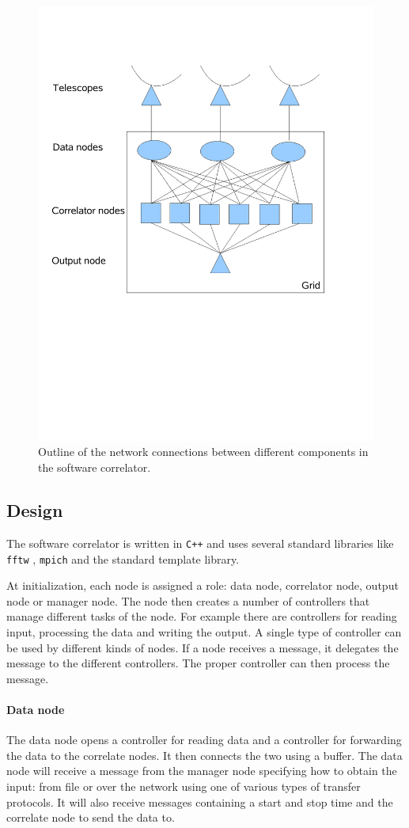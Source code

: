 \documentclass[12pt]{article}
\begin{document}
\begin{figure}
  \centering
  \includegraphics[width=.45\textwidth]
    {img/NetworkConnections}
    \caption{Outline of the network connections between different
      components in the software correlator.}
  \label{fig:netw_corr}
\end{figure}


\subsection{Design}
The software correlator is written in \verb~C++~ and uses several
standard libraries like \verb~fftw~ \cite{FFTW05}, \verb~mpich~
\cite{Gropp:1996:HPI} and the standard template library.

At initialization, each node is assigned a role: data node, correlator
node, output node or manager node. The node then creates a number of
controllers that manage different tasks of the node. For example there
are controllers for reading input, processing the data and writing the
output. A single type of controller can be used by different kinds of
nodes. If a node receives a message, it delegates the message to the
different controllers. The proper controller can then process the
message.

\paragraph{Data node}
The data node opens a controller for reading data and a controller for
forwarding the data to the correlate nodes. It then connects the two
using a buffer. The data node will receive a message from the manager
node specifying how to obtain the input: from file or over the network
using one of various types of transfer protocols. It will also receive
messages containing a start and stop time and the correlate node to
send the data to.
\end{document}
